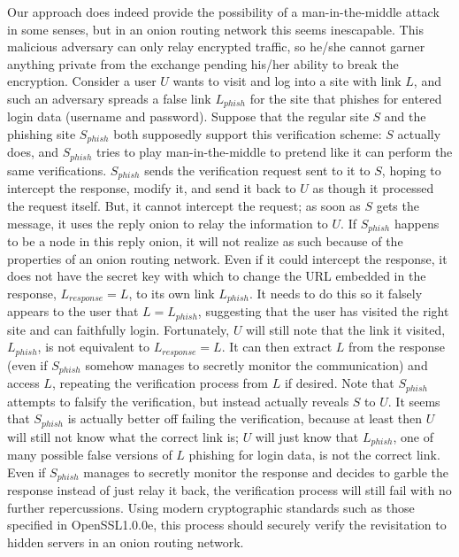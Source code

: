 \documentclass[12pt]{article}
\begin{document}
Our approach does indeed provide the possibility of a man-in-the-middle attack in some senses, but in an onion routing network this seems inescapable. This malicious adversary can only relay encrypted traffic, so he/she cannot garner anything private from the exchange pending his/her ability to break the encryption. Consider a user $U$ wants to visit and log into a site with link $L$, and such an adversary spreads a false link $L_{phish}$ for the site that phishes for entered login data (username and password). Suppose that the regular site $S$ and the phishing site $S_{phish}$ both supposedly support this verification scheme: $S$ actually does, and $S_{phish}$ tries to play man-in-the-middle to pretend like it can perform the same verifications. $S_{phish}$ sends the verification request sent to it to $S$, hoping to intercept the response, modify it, and send it back to $U$ as though it processed the request itself. But, it cannot intercept the request; as soon as $S$ gets the message, it uses the reply onion to relay the information to $U$. If $S_{phish}$ happens to be a node in this reply onion, it will not realize as such because of the properties of an onion routing network. Even if it could intercept the response, it does not have the secret key with which to change the URL embedded in the response, $L_{response} = L$, to its own link $L_{phish}$. It needs to do this so it falsely appears to the user that $L = L_{phish}$, suggesting that the user has visited the right site and can faithfully login. Fortunately, $U$ will still note that the link it visited, $L_{phish}$, is not equivalent to $L_{response} = L$. It can then extract $L$ from the response (even if $S_{phish}$ somehow manages to secretly monitor the communication) and access $L$, repeating the verification process from $L$ if desired. Note that $S_{phish}$ attempts to falsify the verification, but instead actually reveals $S$ to $U$. It seems that $S_{phish}$ is actually better off failing the verification, because at least then $U$ will still not know what the correct link is; $U$ will just know that $L_{phish}$, one of many possible false versions of $L$ phishing for login data, is not the correct link. Even if $S_{phish}$ manages to secretly monitor the response and decides to garble the response instead of just relay it back, the verification process will still fail with no further repercussions. Using modern cryptographic standards such as those specified in OpenSSL1.0.0e, this process should securely verify the revisitation to hidden servers in an onion routing network.
\end{document}
